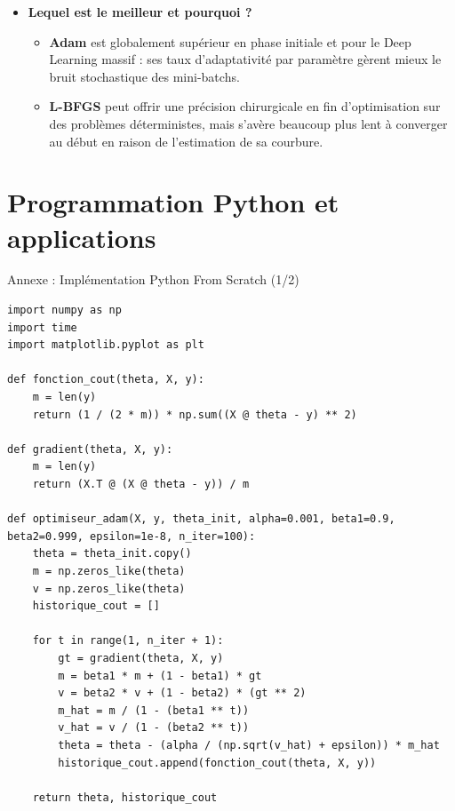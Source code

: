 \documentclass{beamer}
\begin{document}
        \begin{frame}
        \begin{itemize}
        \item \textbf{Lequel est le meilleur et pourquoi ?} 
        \begin{itemize}
            \item \textbf{Adam} est globalement supérieur en phase initiale et pour le Deep Learning massif : ses taux d'adaptativité par paramètre gèrent mieux le bruit stochastique des mini-batchs.
            \item \textbf{L-BFGS} peut offrir une précision chirurgicale en fin d'optimisation sur des problèmes déterministes, mais s'avère beaucoup plus lent à converger au début en raison de l'estimation de sa courbure.
        \end{itemize}
    \end{itemize}
\end{frame}
\section{Programmation Python et applications}
\begin{frame}[fragile]{Annexe : Implémentation Python From Scratch (1/2)}
    \begin{lstlisting}
import numpy as np
import time
import matplotlib.pyplot as plt

def fonction_cout(theta, X, y):
    m = len(y)
    return (1 / (2 * m)) * np.sum((X @ theta - y) ** 2)

def gradient(theta, X, y):
    m = len(y)
    return (X.T @ (X @ theta - y)) / m

def optimiseur_adam(X, y, theta_init, alpha=0.001, beta1=0.9, beta2=0.999, epsilon=1e-8, n_iter=100):
    theta = theta_init.copy()
    m = np.zeros_like(theta)
    v = np.zeros_like(theta)
    historique_cout = []
    
    for t in range(1, n_iter + 1):
        gt = gradient(theta, X, y)
        m = beta1 * m + (1 - beta1) * gt
        v = beta2 * v + (1 - beta2) * (gt ** 2)
        m_hat = m / (1 - (beta1 ** t))
        v_hat = v / (1 - (beta2 ** t))
        theta = theta - (alpha / (np.sqrt(v_hat) + epsilon)) * m_hat
        historique_cout.append(fonction_cout(theta, X, y))
        
    return theta, historique_cout
    \end{lstlisting}
\end{frame}
\end{document}
